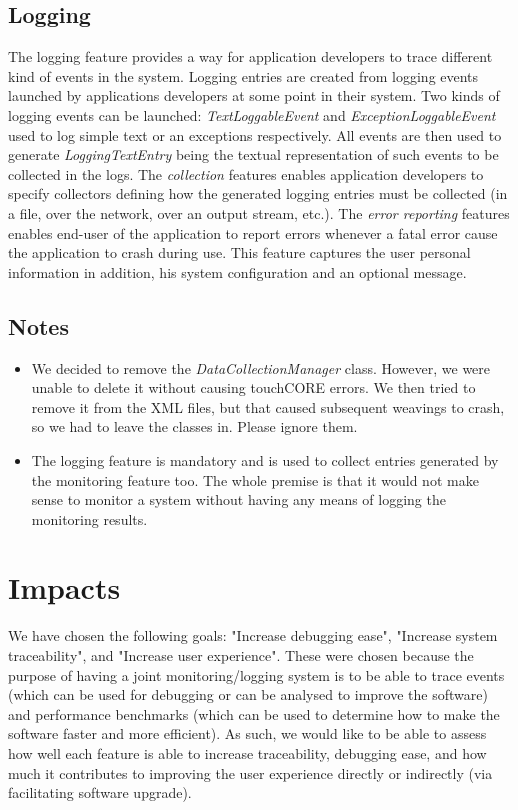 \documentclass[paper=letter, fontsize=12pt]{scrartcl} %
\numberwithin{equation}{section} %
\numberwithin{figure}{section} %
\numberwithin{table}{section} %
\begin{document}
\subsection{Logging}
\hspace*{.5cm} The logging feature provides a way for application developers to trace different kind of events in the system. Logging entries are created from logging events launched by applications developers at some point in their system. Two kinds of logging events can be launched: \textit{TextLoggableEvent} and \textit{ExceptionLoggableEvent} used to log simple text or an exceptions respectively. All events are then used to generate \textit{LoggingTextEntry} being the textual representation of such events to be collected in the logs. The \textit{collection} features enables application developers to specify collectors defining how the generated logging entries must be collected (in a file, over the network, over an output stream, etc.). The \textit{error reporting} features enables end-user of the application to report errors whenever a fatal error cause the application to crash during use. This feature captures the user personal information in addition, his system configuration and an optional message. 


\subsection{Notes}
\begin{itemize}
\item We decided to remove the \textit{DataCollectionManager} class. However, we were unable to delete it without causing touchCORE errors. We then tried to remove it from the XML files, but that caused subsequent weavings to crash, so we had to leave the classes in. Please ignore them.
\item The logging feature is mandatory and is used to collect entries generated by the monitoring feature too. The whole premise is that it would not make sense to monitor a system without having any means of logging the monitoring results.
\end{itemize}

\newpage
\section{Impacts}
\hspace*{.5cm} We have chosen the following goals: "Increase debugging ease", "Increase system traceability", and "Increase user experience". These were chosen because the purpose of having a joint monitoring/logging system is to be able to trace events (which can be used for debugging or can be analysed to improve the software) and performance benchmarks (which can be used to determine how to make the software faster and more efficient). As such, we would like to be able to assess how well each feature is able to increase traceability, debugging ease, and how much it contributes to improving the user experience directly or indirectly (via facilitating software upgrade).
\end{document}
